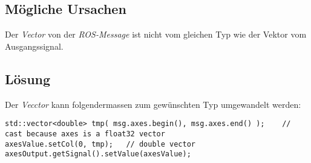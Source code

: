 \subsection{Mögliche Ursachen}
Der \textit{Vector} von der \textit{ROS-Message} ist nicht vom gleichen Typ wie der Vektor vom Ausgangssignal.

\subsection{Lösung}
Der \textit{Vecctor} kann folgendermassen zum gewünschten Typ umgewandelt werden:
\lstset{language=C++}
\begin{lstlisting}
std::vector<double> tmp( msg.axes.begin(), msg.axes.end() );	// cast because axes is a float32 vector
axesValue.setCol(0, tmp);	// double vector
axesOutput.getSignal().setValue(axesValue); 
\end{lstlisting}